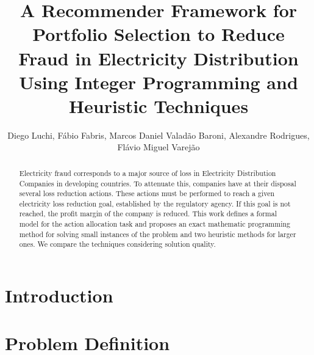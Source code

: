 \documentclass{llncs}
\begin{document}
%
\title{A Recommender Framework for Portfolio Selection to Reduce
Fraud in Electricity Distribution Using Integer Programming and Heuristic Techniques}


\author{Diego Luchi, 
F\'abio Fabris, 
Marcos Daniel Valad\~ao Baroni,
Alexandre Rodrigues,
Fl\'avio Miguel Varej\~ao
}


\maketitle

\begin{abstract}
Electricity fraud corresponds to a major source of loss in Electricity
Distribution Companies in developing countries. To attenuate this,
companies have at their disposal several loss reduction actions. These actions
must be performed to reach a given electricity loss reduction goal, established
by the regulatory agency. If this goal is not reached, the profit margin
of the company is reduced.
This work defines a formal model for the action allocation task 
and proposes an exact mathematic programming method for solving small instances of
the problem and two heuristic methods for larger ones. We compare
the techniques considering solution quality.

\end{abstract}


\section{Introduction}
\label{sec:intro}


\section{Problem Definition}
\label{sec:defi}

\end{document}
